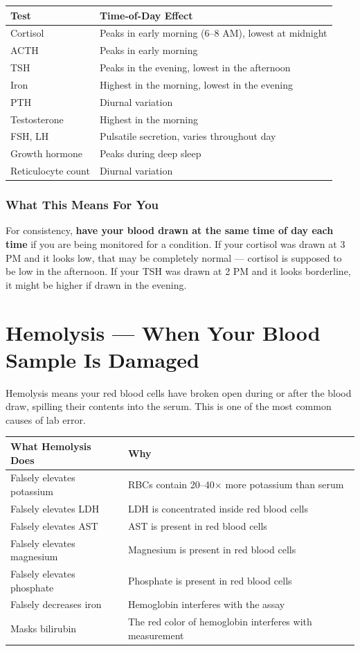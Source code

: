 \begin{longtable}{@{}p{4.5cm}p{10.5cm}@{}}
\toprule
\textbf{Test} & \textbf{Time-of-Day Effect} \\
\midrule
Cortisol & Peaks in early morning (6--8 AM), lowest at midnight \\
ACTH & Peaks in early morning \\
TSH & Peaks in the evening, lowest in the afternoon \\
Iron & Highest in the morning, lowest in the evening \\
PTH & Diurnal variation \\
Testosterone & Highest in the morning \\
FSH, LH & Pulsatile secretion, varies throughout day \\
Growth hormone & Peaks during deep sleep \\
Reticulocyte count & Diurnal variation \\
\bottomrule
\end{longtable}

\subsubsection{What This Means For You}

For consistency, \textbf{have your blood drawn at the same time of day each time} if you are being monitored for a condition. If your cortisol was drawn at 3 PM and it looks low, that may be completely normal --- cortisol is supposed to be low in the afternoon. If your TSH was drawn at 2 PM and it looks borderline, it might be higher if drawn in the evening.

\clearpage
\section{Hemolysis --- When Your Blood Sample Is Damaged}

Hemolysis means your red blood cells have broken open during or after the blood draw, spilling their contents into the serum. This is one of the most common causes of lab error.

\begin{longtable}{@{}p{4.5cm}p{10.5cm}@{}}
\toprule
\textbf{What Hemolysis Does} & \textbf{Why} \\
\midrule
Falsely elevates potassium & RBCs contain 20--40$\times$ more potassium than serum \\
Falsely elevates LDH & LDH is concentrated inside red blood cells \\
Falsely elevates AST & AST is present in red blood cells \\
Falsely elevates magnesium & Magnesium is present in red blood cells \\
Falsely elevates phosphate & Phosphate is present in red blood cells \\
Falsely decreases iron & Hemoglobin interferes with the assay \\
Masks bilirubin & The red color of hemoglobin interferes with measurement \\
\bottomrule
\end{longtable}

